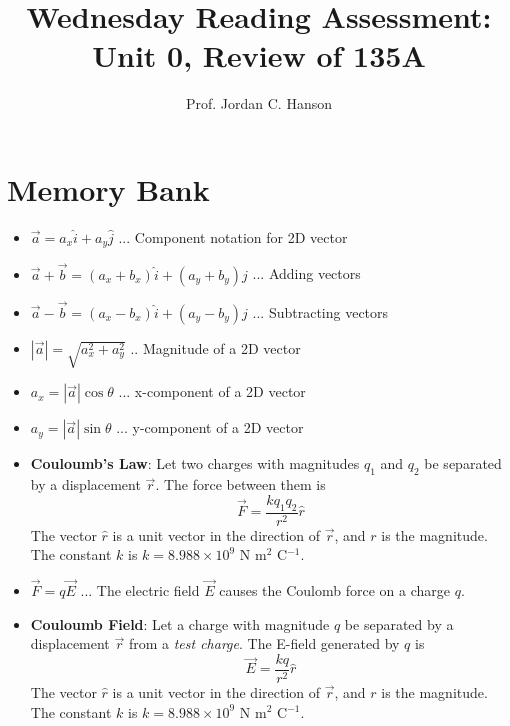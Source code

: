 \documentclass{article}
\begin{document}
\twocolumn

\title{Wednesday Reading Assessment: Unit 0, Review of 135A}
\author{Prof. Jordan C. Hanson}

\maketitle

\section{Memory Bank}

\begin{itemize}
\item $\vec{a} = a_x \hat{i} + a_y \hat{j}$ ... Component notation for 2D vector
\item $\vec{a} + \vec{b} = (a_x + b_x)\hat{i} + (a_y + b_y)\hat{j}$ ... Adding vectors
\item $\vec{a} - \vec{b} = (a_x - b_x)\hat{i} + (a_y - b_y)\hat{j}$ ... Subtracting vectors
\item $|\vec{a}| = \sqrt{a_x^2 + a_y^2}$ .. Magnitude of a 2D vector
\item $a_x = |\vec{a}|\cos\theta$ ... x-component of a 2D vector
\item $a_y = |\vec{a}|\sin\theta$ ... y-component of a 2D vector
\item \textbf{Couloumb's Law}: Let two charges with magnitudes $q_1$ and $q_2$ be separated by a displacement $\vec{r}$.  The force between them is 
\begin{equation}
\vec{F} = \frac{k q_1 q_2}{r^2}\hat{r}
\end{equation}
The vector $\hat{r}$ is a unit vector in the direction of $\vec{r}$, and $r$ is the magnitude.  The constant $k$ is $k=8.988 \times 10^9$ N m$^2$ C$^{-1}$.
\item $\vec{F} = q\vec{E}$ ... The electric field $\vec{E}$ causes the Coulomb force on a charge $q$.
\item \textbf{Couloumb Field}: Let a charge with magnitude $q$ be separated by a displacement $\vec{r}$ from a \textit{test charge}.  The E-field generated by $q$ is 
\begin{equation}
\vec{E} = \frac{k q}{r^2}\hat{r}
\end{equation}
The vector $\hat{r}$ is a unit vector in the direction of $\vec{r}$, and $r$ is the magnitude.  The constant $k$ is $k=8.988 \times 10^9$ N m$^2$ C$^{-1}$.
\end{itemize}
\end{document}

